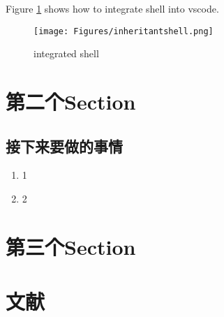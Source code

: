 \documentclass[UTF8,fancyhdr,a4paper]{ctexart}
\begin{document}
Figure \ref{integrated shell} shows how to integrate shell into vscode.
\begin{figure}[h]
      \centering
      \texttt{[image: Figures/inheritantshell.png]}
      \caption{integrated shell}
      \label{integrated shell}
\end{figure}


\section{第二个Section}

\subsection{接下来要做的事情}
\begin{enumerate}
      \item 1
      \item 2


\end{enumerate}

\newpage
\section{第三个Section}

\newpage
\section{文献}


\end{document}

